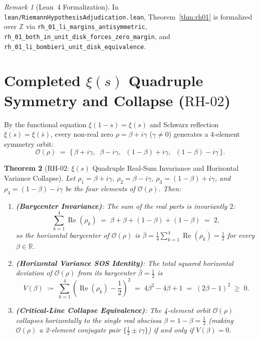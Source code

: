 \documentclass[11pt,a4paper]{article}
\theoremstyle{plain}
\newtheorem{theorem}{Theorem}[section]
\theoremstyle{definition}
\theoremstyle{remark}
\newtheorem{remark}[theorem]{Remark}
\newcommand{\R}{\mathbb{R}}
\newcommand{\Z}{\mathbb{Z}}
\DeclareMathOperator{\RePart}{Re}
\begin{document}
\begin{remark}[Lean~4 Formalization]
In \texttt{lean/RiemannHypothesisAdjudication.lean}, Theorem~\ref{thm:rh01} is formalized over $\Z$ via \texttt{rh\_01\_li\_margins\_antisymmetric}, \texttt{rh\_01\_both\_in\_unit\_disk\_forces\_zero\_margin}, and \texttt{rh\_01\_li\_bombieri\_unit\_disk\_equivalence}.
\end{remark}

\section{Completed \texorpdfstring{$\xi(s)$}{Xi(s)} Quadruple Symmetry and Collapse (\texorpdfstring{$\mathrm{RH\text{-}02}$}{RH-02})}

By the functional equation $\xi(1-s) = \xi(s)$ and Schwarz reflection $\overline{\xi(s)} = \xi(\bar{s})$, every non-real zero $\rho = \beta + i\gamma$ ($\gamma \ne 0$) generates a 4-element symmetry orbit:
\begin{equation}
  \mathcal{O}(\rho) \;=\; \bigl\{\, \beta + i\gamma,\;\; \beta - i\gamma,\;\; (1 - \beta) + i\gamma,\;\; (1 - \beta) - i\gamma \,\bigr\}.
\end{equation}

\begin{theorem}[$\mathrm{RH\text{-}02}$: $\xi(s)$ Quadruple Real-Sum Invariance and Horizontal Variance Collapse]\label{thm:rh02}
Let $\rho_1 = \beta + i\gamma$, $\rho_2 = \beta - i\gamma$, $\rho_3 = (1-\beta) + i\gamma$, and $\rho_4 = (1-\beta) - i\gamma$ be the four elements of $\mathcal{O}(\rho)$. Then:
\begin{enumerate}
  \item \textbf{(Barycenter Invariance)}: The sum of the real parts is invariantly $2$:
  \begin{equation}
    \sum_{k=1}^{4} \RePart(\rho_k) \;=\; \beta + \beta + (1 - \beta) + (1 - \beta) \;=\; 2,
  \end{equation}
  so the horizontal barycenter of $\mathcal{O}(\rho)$ is $\bar{\beta} = \frac{1}{4}\sum_{k=1}^{4}\RePart(\rho_k) = \frac{1}{2}$ for every $\beta \in \R$.
  \item \textbf{(Horizontal Variance SOS Identity)}: The total squared horizontal deviation of $\mathcal{O}(\rho)$ from its barycenter $\bar{\beta} = \frac{1}{2}$ is
  \begin{equation}\label{eq:rh02-sos}
    V(\beta) \;\coloneqq\; \sum_{k=1}^{4} \left(\RePart(\rho_k) - \frac{1}{2}\right)^2 \;=\; 4\beta^2 - 4\beta + 1 \;=\; (2\beta - 1)^2 \;\ge\; 0.
  \end{equation}
  \item \textbf{(Critical-Line Collapse Equivalence)}: The 4-element orbit $\mathcal{O}(\rho)$ collapses horizontally to the single real abscissa $\beta = 1 - \beta = \frac{1}{2}$ (making $\mathcal{O}(\rho)$ a 2-element conjugate pair $\{\frac{1}{2} \pm i\gamma\}$) if and only if $V(\beta) = 0$.
\end{enumerate}
\end{theorem}
\end{document}
